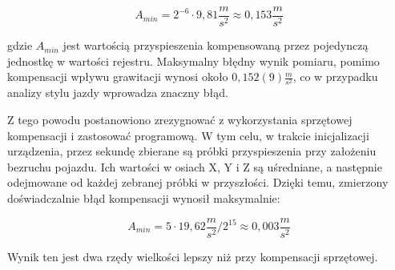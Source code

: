 \begin{equation}
A_{min} = 2^{-6} \cdot 9,81\frac{m}{s^2} \approx 0,153 \frac{m}{s^2}
\end{equation}

gdzie $A_{min}$ jest wartością przyspieszenia kompensowaną przez pojedynczą jednostkę w wartości rejestru. Maksymalny błędny wynik pomiaru, pomimo kompensacji wpływu grawitacji wynosi około $0,152(9) \frac{m}{s^2}$, co w przypadku analizy stylu jazdy wprowadza znaczny błąd. 

Z tego powodu postanowiono zrezygnować z wykorzystania sprzętowej kompensacji i zastosować programową. W tym celu, w trakcie inicjalizacji urządzenia, przez sekundę zbierane są próbki przyspieszenia przy założeniu bezruchu pojazdu. Ich wartości w osiach X, Y i Z są uśredniane, a następnie odejmowane od każdej zebranej próbki w przyszłości. Dzięki temu, zmierzony doświadczalnie błąd kompensacji wynosił maksymalnie:

 \begin{equation}
A_{min} = 5 \cdot 19,62\frac{m}{s^2}/{2^{15}} \approx 0,003 \frac{m}{s^2}
\end{equation}

Wynik ten jest dwa rzędy wielkości lepszy niż przy kompensacji sprzętowej.